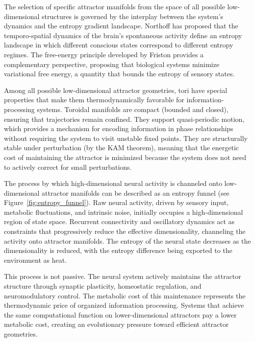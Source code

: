 \documentclass[12pt,a4paper]{article}
\makeatletter
\let\orig@subsection\subsection
\renewcommand{\subsection}{\@ifstar{\orig@subsection*}{\@dblarg{\my@subsection}}}
\def\my@subsection[#1]#2{\orig@subsection[#1]{#2}\noindent\@afterindentfalse\@afterheading}
\makeatother
\begin{document}
The selection of specific attractor manifolds from the space of all possible low-dimensional structures is governed by the interplay between the system's dynamics and the entropy gradient landscape.
Northoff \cite{Northoff2019, Northoff2022} has proposed that the temporo-spatial dynamics of the brain's spontaneous activity define an entropy landscape in which different conscious states correspond to different entropy regimes.
The free-energy principle developed by Friston \cite{Friston2010} provides a complementary perspective, proposing that biological systems minimize variational free energy, a quantity that bounds the entropy of sensory states.

Among all possible low-dimensional attractor geometries, tori have special properties that make them thermodynamically favorable for information-processing systems.
Toroidal manifolds are compact (bounded and closed), ensuring that trajectories remain confined.
They support quasi-periodic motion, which provides a mechanism for encoding information in phase relationships without requiring the system to visit unstable fixed points.
They are structurally stable under perturbation (by the KAM theorem), meaning that the energetic cost of maintaining the attractor is minimized because the system does not need to actively correct for small perturbations.

\subsection{The Entropy Funnel}

The process by which high-dimensional neural activity is channeled onto low-dimensional attractor manifolds can be described as an entropy funnel (see Figure~\ref{fig:entropy_funnel}).
Raw neural activity, driven by sensory input, metabolic fluctuations, and intrinsic noise, initially occupies a high-dimensional region of state space.
Recurrent connectivity and oscillatory dynamics act as constraints that progressively reduce the effective dimensionality, channeling the activity onto attractor manifolds.
The entropy of the neural state decreases as the dimensionality is reduced, with the entropy difference being exported to the environment as heat.

This process is not passive.
The neural system actively maintains the attractor structure through synaptic plasticity, homeostatic regulation, and neuromodulatory control.
The metabolic cost of this maintenance represents the thermodynamic price of organized information processing.
Systems that achieve the same computational function on lower-dimensional attractors pay a lower metabolic cost, creating an evolutionary pressure toward efficient attractor geometries.
\end{document}
